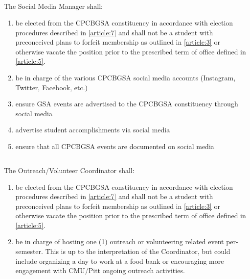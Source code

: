 \documentclass[11pt,a4paper]{article}
\begin{document}
\subsection{} The Social Media Manager shall:
\begin{enumerate}        
	\item  be elected from the CPCBGSA constituency in accordance with election procedures described in \cref{article:7} and shall not be a student with preconceived plans to forfeit membership as outlined in \cref{article:3} or otherwise vacate the position prior to the prescribed term of office defined in \cref{article:5}.
	\item be in charge of the various CPCBGSA social media accounts (Instagram, Twitter, Facebook, etc.)
	\item ensure GSA events are advertised to the CPCBGSA constituency through social media
	\item advertise student accomplishments via social media
	\item ensure that all CPCBGSA events are documented on social media
\end{enumerate}        

\subsection{}The Outreach/Volunteer Coordinator shall:
\begin{enumerate}
    \item be elected from the CPCBGSA constituency in accordance with election procedures described in \cref{article:7} and shall not be a student with preconceived plans to forfeit membership as outlined in \cref{article:3} or otherwise vacate the position prior to the prescribed term of office defined in \cref{article:5}.
    \item be in charge of hosting one (1) outreach or volunteering related event per-semester. This is up to the interpretation of the Coordinator, but could include organizing a day to work at a food bank or encouraging more engagement with CMU/Pitt ongoing outreach activities. 
\end{enumerate}
\end{document}
